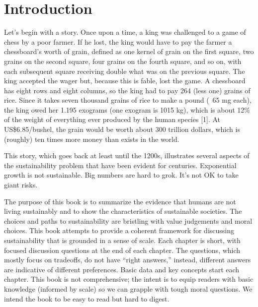 \documentclass{book}\usepackage[]{graphicx}\usepackage[]{color}
\begin{document}

 \frontmatter                   %

 \mainmatter
    

\chapter{Introduction}
\label{chap:introduction}

Let’s begin with a story. Once upon a time, a king was challenged to a game of chess by a poor farmer. If he lost, the king would have to pay the farmer a chessboard’s worth of grain, defined as one kernel of grain on the first square, two grains on the second square, four grains on the fourth square, and so on, with each subsequent square receiving double what was on the previous square. The king accepted the wager but, because this is fable, lost the game. A chessboard has eight rows and eight columns, so the king had to pay 264 (less one) grains of rice. Since it takes seven thousand grains of rice to make a pound (~65 mg each), the king owed her 1.195 exograms (one exogram is 1015 kg), which is about 12\% of the weight of everything ever produced by the human species [1]. At US\$6.85/bushel, the grain would be worth about 300 trillion dollars, which is (roughly) ten times more money than exists in the world. 

This story, which goes back at least until the 1200s, illustrates several aspects of the sustainability problem that have been evident for centuries.  Exponential growth is not sustainable. 
Big numbers are hard to grok. %
It’s not OK to take giant risks.

The purpose of this book is to summarize the evidence that humans are not living sustainably and to show the characteristics of sustainable societies. The choices and paths to sustainability are bristling with value judgements and moral choices. This book attempts to provide a coherent framework for discussing sustainability that is grounded in a sense of scale. Each chapter is short, with focused discussion questions at the end of each chapter. The questions, which mostly focus on tradeoffs, do not have “right answers,” instead, different answers are indicative of different preferences. Basic data and key concepts start each chapter. This book is not comprehensive; the intent is to equip readers with basic knowledge (informed by scale) so we can grapple with tough moral questions. We intend the book to be easy to read but hard to digest. 
\end{document}
